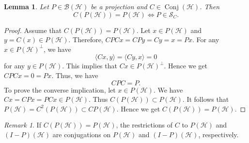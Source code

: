 \documentclass[11pt]{amsart}
\newtheorem{lemma}[theorem]{Lemma}
\theoremstyle{remark}
\newtheorem{remark}[theorem]{Remark}
\newcommand{\BH}{\mathcal{B(H)}}
\newcommand{\cH}{{\mathcal{H}}}
\newcommand{\SC}{\mathcal{S}_C}
\newcommand{\Conj}{\operatorname{Conj}(\cH)}
\begin{document}
\begin{lemma}\label{projectionC}
Let $P \in \BH$ be a projection and $C \in \Conj$. Then 
\[
C(P(\cH))=P(\cH) \Longleftrightarrow P \in \SC.
\]
\end{lemma}
\begin{proof}
Assume that $C(P(\cH))=P(\cH)$. Let $x \in P(\cH)$ and  $y=C(x) \in P(\cH)$. Therefore, $CPCx=CPy=Cy=x=Px$. For any $x \in P(\cH)^{\perp}$, we have
\[
\langle Cx, y \rangle=\langle Cy, x \rangle =0
\]
for any $y \in P(\cH)$. This implies that $Cx \in  P(\cH)^{\perp}$. Hence we get $CPCx=0=Px$. Thus,  we have
\[
CPC=P.
\]
To prove the converse implication, let $x \in P(\cH)$. We have $Cx=CPx=PCx \in P(\cH)$. Thus $C(P(\cH)) \subset P(\cH)$. It follows that $P(\cH)=C^2(P(\cH)) \subset CP(\cH)$. Hence we get $C(P(\cH)) = P(\cH)$.
\end{proof}

\begin{remark}\label{projC}
 If $C(P(\cH)) = P(\cH)$, the restrictions of $C$ to $P(\cH)$ and  $(I-P)(\cH)$ are conjugations on $P(\cH)$ and $(I-P)(\cH)$, respectively.
\end{remark}
\end{document}
